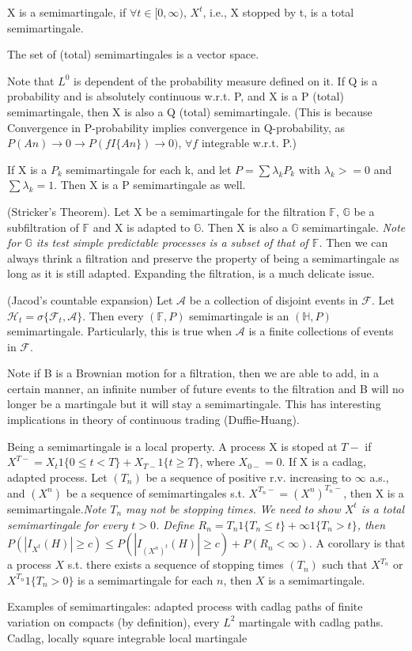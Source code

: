 X is a semimartingale, if $ \forall t\in[0,\infty) $, $ X^t $, i.e., X stopped by t, is a total semimartingale.

The set of (total) semimartingales is a vector space.

Note that $ L^0 $ is dependent of the probability measure defined on it. If Q is a probability and is absolutely continuous w.r.t. P, and X is a P (total) semimartingale, then X is also a Q (total) semimartingale. (This is because Convergence in P-probability implies convergence in Q-probability, as $ P(An)\to 0 \rightarrow P(fI\{An\})\to 0) $, $ \forall f  $ integrable w.r.t. P.)

If X is a $ P_k $ semimartingale  for each k, and let $ P=\sum \lambda_k P_k $ with $ \lambda_k>=0 $ and $ \sum \lambda_k=1 $. Then X is a P semimartingale as well.

(Stricker's Theorem). Let X be a semimartingale for the filtration $ \mathbb{F} $, $ \mathbb{G} $ be a subfiltration of $ \mathbb{F} $ and  X is adapted to $ \mathbb{G} $. Then X is also a $ \mathbb{G} $ semimartingale. {\em Note for $ \mathbb{G} $ its test simple predictable processes is a subset of that of $ \mathbb{F} $.} Then we can always thrink a filtration and preserve the property of being a semimartingale as long as it is still adapted. Expanding the filtration, is a much delicate issue.  

(Jacod's countable expansion) Let $ \mathcal{A} $ be a collection of disjoint events in $ \mathcal{F} $. Let $ \mathcal{H}_t=\sigma\{\mathcal{F}_t,\mathcal{A}\} $. Then every $ (\mathbb{F}, P) $ semimartingale is an $ (\mathbb{H},P) $ semimartingale.  Particularly, this is true when $\mathcal{A} $ is a finite collections of events in $ \mathcal{F} $.

Note if B is a Brownian motion for a filtration, then we are able to add, in a certain manner, an infinite number of future events to the filtration and B will no longer be a martingale but it will stay a semimartingale. This has interesting implications in theory of continuous trading (Duffie-Huang).

Being a semimartingale is a local property. A process X is stoped at $ T- $ if $ X^{T-}=X_t 1\{0\leq t <T\}+X_{T-} 1\{t\geq T\} $, where $ X_{0-}=0 $. If X is a cadlag, adapted process. Let $ (T_n) $ be a sequence of positive r.v. increasing to $ \infty $ a.s., and $ (X^n) $ be a sequence of semimartingales s.t. $ X^{T_n-}=(X^n)^{T_n-} $, then X is a semimartingale.{\small \em Note $ T_n $ may not be stopping times. We need to show $ X^t $ is a total semimartingale for every $ t>0 $. Define $ R_n= T_n 1\{T_n\leq t\} +\infty 1\{T_n > t\} $, then $ P(|I_{X^t}(H)| \geq c)\leq P(|I_{(X^n)^t}(H)|\geq c) +P(R_n<\infty)$. } A corollary is that a process $ X $ s.t. there exists a sequence of stopping times $ (T_n) $ such that $ X^{T_n} $ or $ X^{T_n} 1\{T_n>0\} $ is a semimartingale for each $ n $, then $ X $ is a semimartingale.

Examples of semimartingales: adapted process with cadlag paths of finite variation on compacts (by definition), every $ L^2 $ martingale with cadlag paths. Cadlag, locally square integrable local martingale

